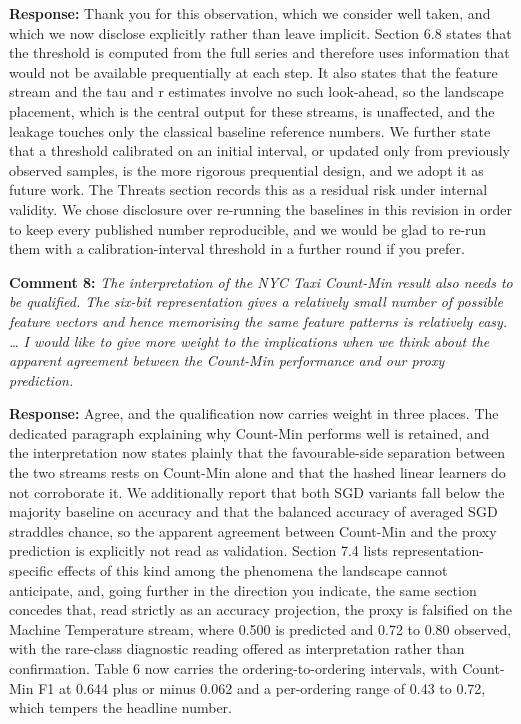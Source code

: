 \documentclass[
  11pt,
]{article}
\begin{document}
\textbf{Response:} Thank you for this observation, which we consider
well taken, and which we now disclose explicitly rather than leave
implicit. Section 6.8 states that the threshold is computed from the
full series and therefore uses information that would not be available
prequentially at each step. It also states that the feature stream and
the tau and r estimates involve no such look-ahead, so the landscape
placement, which is the central output for these streams, is unaffected,
and the leakage touches only the classical baseline reference numbers.
We further state that a threshold calibrated on an initial interval, or
updated only from previously observed samples, is the more rigorous
prequential design, and we adopt it as future work. The Threats section
records this as a residual risk under internal validity. We chose
disclosure over re-running the baselines in this revision in order to
keep every published number reproducible, and we would be glad to re-run
them with a calibration-interval threshold in a further round if you
prefer.

\textbf{Comment 8:} \emph{The interpretation of the NYC Taxi Count-Min
result also needs to be qualified. The six-bit representation gives a
relatively small number of possible feature vectors and hence memorising
the same feature patterns is relatively easy. \ldots{} I would like to
give more weight to the implications when we think about the apparent
agreement between the Count-Min performance and our proxy prediction.}

\textbf{Response:} Agree, and the qualification now carries weight in
three places. The dedicated paragraph explaining why Count-Min performs
well is retained, and the interpretation now states plainly that the
favourable-side separation between the two streams rests on Count-Min
alone and that the hashed linear learners do not corroborate it. We
additionally report that both SGD variants fall below the majority
baseline on accuracy and that the balanced accuracy of averaged SGD
straddles chance, so the apparent agreement between Count-Min and the
proxy prediction is explicitly not read as validation. Section 7.4 lists
representation-specific effects of this kind among the phenomena the
landscape cannot anticipate, and, going further in the direction you
indicate, the same section concedes that, read strictly as an accuracy
projection, the proxy is falsified on the Machine Temperature stream,
where 0.500 is predicted and 0.72 to 0.80 observed, with the rare-class
diagnostic reading offered as interpretation rather than confirmation.
Table 6 now carries the ordering-to-ordering intervals, with Count-Min
F1 at 0.644 plus or minus 0.062 and a per-ordering range of 0.43 to
0.72, which tempers the headline number.
\end{document}
